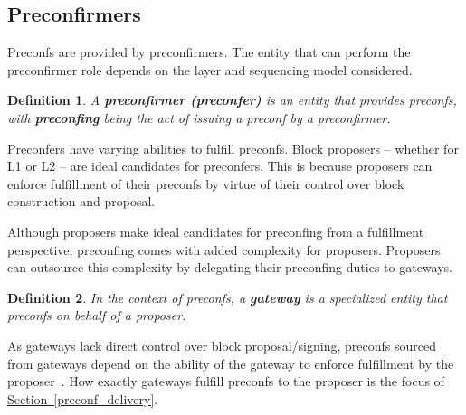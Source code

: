 \documentclass[a4paper]{article}
\theoremstyle{boldstyle}
\newtheorem{definitionx}{Definition}
\newenvironment{definition}
  {\begin{defopenboxq}\begin{definitionx}}
  {\end{definitionx}\end{defopenboxq}}
\newcommand{\cm}[1]{\textcolor{blue}{\textbf{Conor:} #1}}
\newcommand{\qb}[1]{\textcolor{red}{\textbf{Quentin:} #1}}
\newcommand{\ks}[1]{\textcolor{purple}{\textbf{Katerina:} #1}}
\begin{document}
    
    
    \subsection{Preconfirmers}
    \label{sec:preconfirmers_preliminaries}
        Preconfs are provided by preconfirmers. The entity that can perform the preconfirmer role depends on the layer and sequencing model considered. 
        \begin{definition}
        A \textbf{preconfirmer (preconfer)} is an entity that provides preconfs, with \textbf{preconfing} being the act of issuing a preconf by a preconfirmer.  
        \end{definition}
        
        Preconfers have varying abilities to fulfill preconfs. Block proposers -- whether for L1 or L2 -- are ideal candidates for preconfers. This is because proposers can enforce fulfillment of their preconfs by virtue of their control over block construction and proposal.
        
        Although proposers make ideal candidates for preconfing from a fulfillment perspective, preconfing comes with added complexity for proposers. Proposers can outsource this complexity by delegating their preconfing duties to gateways.
        \begin{definition}
        \label{def:preconfirmation}
        In the context of preconfs, a \textbf{gateway} is a specialized entity that preconfs on behalf of a proposer.
        \end{definition}
        As gateways lack direct control over block proposal/signing, preconfs sourced from gateways depend on the ability of the gateway to enforce fulfillment by the proposer~\cite{W:ThePreconfirmationGatewayUnlockingPreconfirmations:FromUsertoPreconfer, W:Ahead-of-TimeBlockAuctionsToEnableExecutionPreconfirmations,W:DelegationinBolt:OutsourcingSophisticationWhilePreservingDecentralization}. How exactly gateways fulfill preconfs to the proposer is the focus of \hyperref[preconf_delivery]{Section~\ref{preconf_delivery}}.
        
\end{document}
